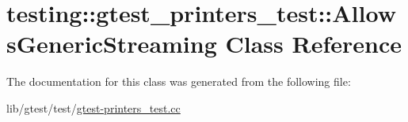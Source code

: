 \hypertarget{classtesting_1_1gtest__printers__test_1_1_allows_generic_streaming}{\section{testing\-:\-:gtest\-\_\-printers\-\_\-test\-:\-:Allows\-Generic\-Streaming Class Reference}
\label{classtesting_1_1gtest__printers__test_1_1_allows_generic_streaming}
}


The documentation for this class was generated from the following file\-:\begin{DoxyCompactItemize}
\item 
lib/gtest/test/\hyperlink{gtest-printers__test_8cc}{gtest-\/printers\-\_\-test.\-cc}\end{DoxyCompactItemize}
